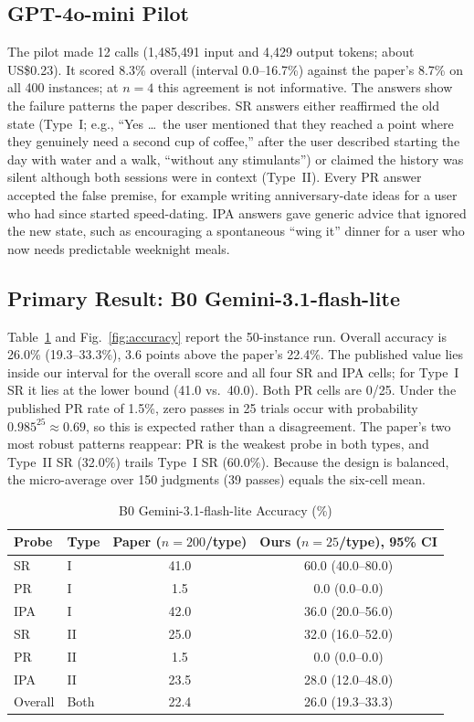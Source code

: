 \documentclass[conference]{IEEEtran}
\begin{document}
\subsection{GPT-4o-mini Pilot}
The pilot made 12 calls (1{,}485{,}491 input and 4{,}429 output tokens; about US\$0.23). It scored 8.3\% overall (interval 0.0--16.7\%) against the paper's 8.7\% on all 400 instances; at $n=4$ this agreement is not informative. The answers show the failure patterns the paper describes. SR answers either reaffirmed the old state (Type~I; e.g., ``Yes \ldots\ the user mentioned that they reached a point where they genuinely need a second cup of coffee,'' after the user described starting the day with water and a walk, ``without any stimulants'') or claimed the history was silent although both sessions were in context (Type~II). Every PR answer accepted the false premise, for example writing anniversary-date ideas for a user who had since started speed-dating. IPA answers gave generic advice that ignored the new state, such as encouraging a spontaneous ``wing it'' dinner for a user who now needs predictable weeknight meals.

\subsection{Primary Result: B0 Gemini-3.1-flash-lite}\label{sec:results-gemini}
Table~\ref{tab:main} and Fig.~\ref{fig:accuracy} report the 50-instance run. Overall accuracy is 26.0\% (19.3--33.3\%), 3.6 points above the paper's 22.4\%. The published value lies inside our interval for the overall score and all four SR and IPA cells; for Type~I SR it lies at the lower bound (41.0 vs.\ 40.0). Both PR cells are 0/25. Under the published PR rate of 1.5\%, zero passes in 25 trials occur with probability $0.985^{25} \approx 0.69$, so this is expected rather than a disagreement. The paper's two most robust patterns reappear: PR is the weakest probe in both types, and Type~II SR (32.0\%) trails Type~I SR (60.0\%). Because the design is balanced, the micro-average over 150 judgments (39 passes) equals the six-cell mean.

\begin{table}[t]
\caption{B0 Gemini-3.1-flash-lite Accuracy (\%)}\label{tab:main}
\centering\footnotesize\setlength{\tabcolsep}{4pt}
\begin{tabular}{@{}llcc@{}}
\toprule
Probe & Type & Paper ($n{=}200$/type) & Ours ($n{=}25$/type), 95\% CI \\
\midrule
SR & I & 41.0 & 60.0 (40.0--80.0) \\
PR & I & 1.5 & 0.0 (0.0--0.0) \\
IPA & I & 42.0 & 36.0 (20.0--56.0) \\
SR & II & 25.0 & 32.0 (16.0--52.0) \\
PR & II & 1.5 & 0.0 (0.0--0.0) \\
IPA & II & 23.5 & 28.0 (12.0--48.0) \\
\midrule
Overall & Both & 22.4 & 26.0 (19.3--33.3) \\
\bottomrule
\end{tabular}
\end{table}
\end{document}
